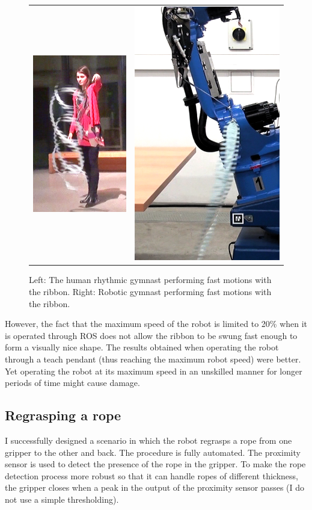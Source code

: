         \begin{figure}[h]
            \centering
            \begin{tabular}{cc}
            \includegraphics[height=0.39\textwidth]{Img/ribbon/HumanGymnastShapes.png}
            &
            \includegraphics[height=0.39\textwidth]{Img/ribbon/RobotGymnastShapes.png}
            \end{tabular}
            \caption{Left: The human rhythmic gymnast performing fast motions with the ribbon. Right: Robotic gymnast performing fast motions with the ribbon.}
            \label{fig:HumanAndRobotGymnastShapes}
        \end{figure}

        However, the fact that the maximum speed of the robot is limited to 20\% when it is operated through ROS does not allow the ribbon to be swung fast enough to form a visually nice shape. The results obtained when operating the robot through a teach pendant (thus reaching the maximum robot speed) were better. Yet operating the robot at its maximum speed in an unskilled manner for longer periods of time might cause damage.

    \subsection{Regrasping a rope}
        I successfully designed a scenario in which the \CloPeMa\/ robot regrasps a rope from one gripper to the other and back. The procedure is fully automated. The proximity sensor is used to detect the presence of the rope in the gripper. To make the rope detection process more robust so that it can handle ropes of different thickness, the gripper closes when a peak in the output of the proximity sensor passes (I do not use a simple thresholding).

